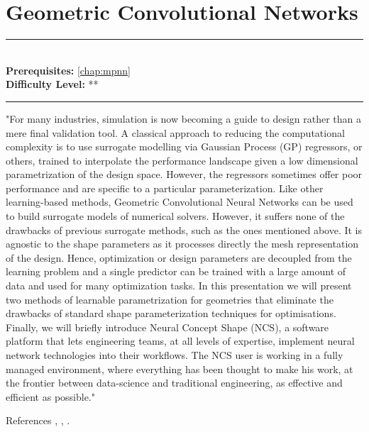 \documentclass[book.tex]{subfiles}
\begin{document}
\chapter{Geometric Convolutional Networks}

\label{chap:geometric_convolutional}
\noindent\rule{11cm}{0.4pt} \\
\textbf{Prerequisites:} \autoref{chap:mpnn} \\
\textbf{Difficulty Level:} ** \\
\noindent\rule{11cm}{0.4pt}
\vspace{5mm}

"For many industries, simulation is now becoming a guide to design rather than a mere final validation tool. A classical approach to reducing the computational complexity is to use surrogate modelling via Gaussian Process (GP) regressors, or others, trained to interpolate the performance landscape given a low dimensional parametrization of the design space. However, the regressors sometimes offer poor performance and are specific to a particular parameterization. Like other learning-based methods, Geometric Convolutional Neural Networks can be used to build surrogate models of numerical solvers. However, it suffers none of the drawbacks of previous surrogate methods, such as the ones mentioned above. It is agnostic to the shape parameters as it processes directly the mesh representation of the design. Hence, optimization or design parameters are decoupled from the learning problem and a single predictor can be trained with a large amount of data and used for many optimization tasks. In this presentation we will present two methods of learnable parametrization for geometries that eliminate the drawbacks of standard shape parameterization techniques for optimisations. Finally, we will briefly introduce Neural Concept Shape (NCS), a software platform that lets engineering teams, at all levels of expertise, implement neural network technologies into their workflows. The NCS user is working in a fully managed environment, where everything has been thought to make his work, at the frontier between data-science and traditional engineering, as effective and efficient as possible."

References \cite{baque2018geodesic}, \cite{remelli2020meshsdf}, \cite{durasov2021masksembles}.
\end{document}
